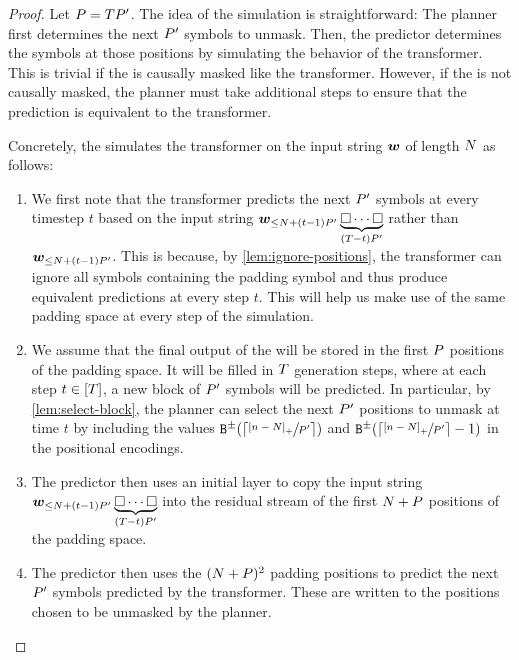 \MDMsAtLeastAsPowerfulAsCoTFP*
\begin{proof}
   Let ${P} = {T} {P}'$.
   The idea of the simulation is straightforward: The planner first determines the next ${P}'$ symbols to unmask.
   Then, the predictor determines the symbols at those positions by simulating the behavior of the \pCoTAcr transformer.
   This is trivial if the \eMDMAcr is causally masked like the \pCoTAcr transformer.
   However, if the \eMDMAcr is not causally masked, the planner must take additional steps to ensure that the prediction is equivalent to the \pCoTAcr transformer.
   
   Concretely, the \eMDMAcr simulates the \pCoTAcr transformer on the input string ${{\boldsymbol{w}}}$ of length ${{N}}$ as follows:
   \begin{enumerate}
      \item We first note that the \pCoTAcr transformer predicts the next ${P}'$ symbols at every timestep $t$ based on the input string ${{\boldsymbol{w}}}_{\leq {{N}} + (t - 1) {P}'} \underbrace{{\square} \cdots {\square}}_{({T} - t) {P}'}$ rather than ${{\boldsymbol{w}}}_{\leq {{N}} + (t - 1) {P}'}$. 
      This is because, by \cref{lem:ignore-positions}, the \pCoTAcr transformer can ignore all symbols containing the padding symbol and thus produce equivalent predictions at every step $t$.
      This will help us make use of the same padding space at every step of the simulation.
      \item We assume that the final output of the \eMDMAcr will be stored in the first ${P}$ positions of the padding space.
      It will be filled in ${T}$ generation steps, where at each step $t \in {\left[ {T}\right]}$, a new block of ${P}'$ symbols will be predicted.
      In particular, by \cref{lem:select-block}, the planner can select the next ${P}'$ positions to unmask at time $t$ by including the values $\sbinFun{\ceil{\sfrac{\posPart{\stridx - \strlen}}{\padlen'}}}$ and $\sbinFun{\ceil{\sfrac{\posPart{\stridx - \strlen}}{\padlen'}} - 1}$ in the positional encodings.
      \item The predictor then uses an initial layer to copy the input string ${{\boldsymbol{w}}}_{\leq {{N}} + (t - 1) {P}'} \underbrace{{\square} \cdots {\square}}_{({T} - t) {P}'}$ into the residual stream of the first ${{N}} + {P}$ positions of the padding space.
      \item The predictor then uses the $({{N}} + {P})^2$ padding positions to predict the next ${P}'$ symbols predicted by the \pCoTAcr transformer.
      These are written to the positions chosen to be unmasked by the planner.
   \end{enumerate}
\end{proof}


